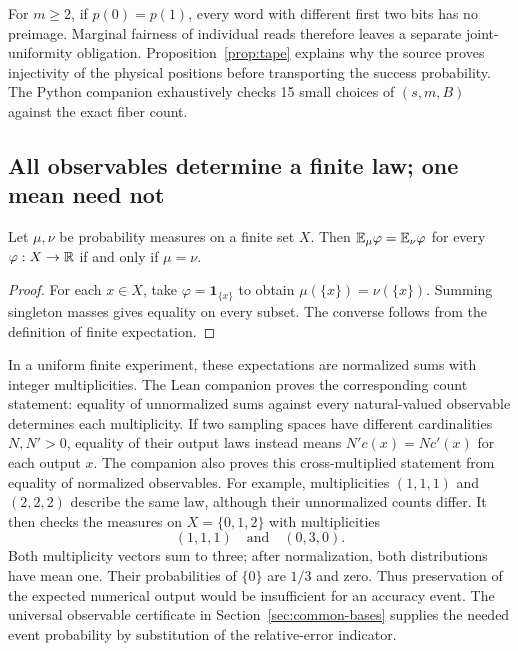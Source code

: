 For $m\geq2$, if $p(0)=p(1)$, every word with different first two bits has no preimage. Marginal fairness of individual reads therefore leaves a separate joint-uniformity obligation. Proposition~\ref{prop:tape} explains why the source proves
injectivity of the physical positions before transporting the success
probability. The Python companion exhaustively checks 15 small choices
of $(s,m,B)$ against the exact fiber count.

\subsection{All observables determine a finite law; one mean need not}
\label{sec:law-example}

\begin{samepage}
\begin{proposition}\label{prop:law}
Let $\mu,\nu$ be probability measures on a finite set $X$. Then
$\mathbb E_\mu\varphi=\mathbb E_\nu\varphi$ for every $\varphi:X\to\mathbb R$ if and only
if $\mu=\nu$.
\end{proposition}
\begin{proof}
For each $x\in X$, take $\varphi=\mathbf1_{\{x\}}$ to obtain
$\mu(\{x\})=\nu(\{x\})$. Summing singleton masses gives equality on every
subset. The converse follows from the definition of finite expectation.
\end{proof}
\end{samepage}

In a uniform finite experiment, these expectations are normalized sums
with integer multiplicities. The Lean companion proves the corresponding
count statement: equality of unnormalized sums against every natural-valued
observable determines each multiplicity. If two sampling spaces have
different cardinalities $N,N'>0$, equality of their output laws instead
means $N'c(x)=Nc'(x)$ for each output $x$. The companion also proves this
cross-multiplied statement from equality of normalized observables.
For example, multiplicities $(1,1,1)$ and $(2,2,2)$ describe the same law,
although their unnormalized counts differ. It then checks the measures on
$X=\{0,1,2\}$ with multiplicities
\[
  (1,1,1)\quad\text{and}\quad(0,3,0).
\]
Both multiplicity vectors sum to three; after normalization, both
distributions have mean one. Their
probabilities of $\{0\}$ are $1/3$ and zero. Thus preservation of the
expected numerical output would be insufficient for an accuracy event.
The universal observable certificate in Section~\ref{sec:common-bases} supplies the needed event probability by substitution of the relative-error indicator.

